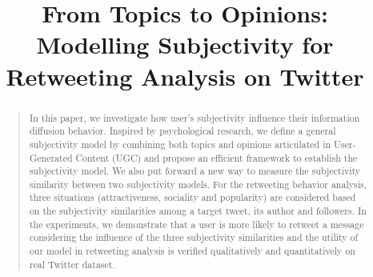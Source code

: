 \documentclass[letterpaper]{article}
\begin{document}
%
\title{From Topics to Opinions: \\Modelling Subjectivity for Retweeting Analysis on Twitter}
\nocopyright
\maketitle
\begin{abstract}
\begin{quote}
In this paper, we investigate how user's subjectivity influence their information diffusion behavior. 
Inspired by psychological research, we define a general subjectivity model by combining both topics and opinions articulated in User-Generated Content (UGC) and propose an efficient framework to establish the subjectivity model. 
We also put forward a new way to measure the subjectivity similarity between two subjectivity models. For the retweeting behavior analysis, three situations (attractiveness, sociality and popularity) are considered based on the subjectivity similarities among a target tweet, its author and followers. In the experiments, we demonstrate that a user is more likely to retweet a message considering the influence of the three subjectivity similarities and the utility of our model in retweeting analysis is verified qualitatively and quantitatively on real Twitter dataset.
\end{quote}
\end{abstract}
\end{document}
